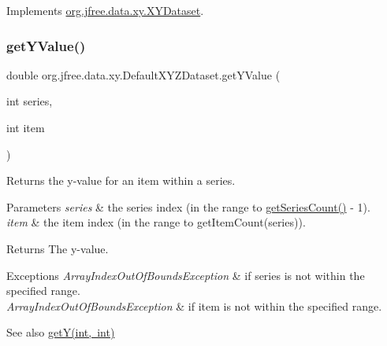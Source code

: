 Implements \mbox{\hyperlink{interfaceorg_1_1jfree_1_1data_1_1xy_1_1_x_y_dataset_aa915867221e0f94021bad3140db5254e}{org.\+jfree.\+data.\+xy.\+X\+Y\+Dataset}}.

\mbox{\label{classorg_1_1jfree_1_1data_1_1xy_1_1_default_x_y_z_dataset_a1d085e3b2a18c6af96b15fd78d4ae9e8}} 
\subsubsection{\texorpdfstring{get\+Y\+Value()}{getYValue()}}
{\footnotesize\ttfamily double org.\+jfree.\+data.\+xy.\+Default\+X\+Y\+Z\+Dataset.\+get\+Y\+Value (\begin{DoxyParamCaption}\item[{int}]{series,  }\item[{int}]{item }\end{DoxyParamCaption})}

Returns the y-\/value for an item within a series.


\begin{DoxyParams}{Parameters}
{\em series} & the series index (in the range {} to {\ttfamily \mbox{\hyperlink{classorg_1_1jfree_1_1data_1_1xy_1_1_default_x_y_z_dataset_a115138a06afdc19d3526ef73fabf578e}{get\+Series\+Count()}} -\/ 1}). \\
\hline
{\em item} & the item index (in the range {} to {\ttfamily get\+Item\+Count(series)}).\\
\hline
\end{DoxyParams}
\begin{DoxyReturn}{Returns}
The y-\/value.
\end{DoxyReturn}

\begin{DoxyExceptions}{Exceptions}
{\em Array\+Index\+Out\+Of\+Bounds\+Exception} & if {\ttfamily series} is not within the specified range. \\
\hline
{\em Array\+Index\+Out\+Of\+Bounds\+Exception} & if {\ttfamily item} is not within the specified range.\\
\hline
\end{DoxyExceptions}
\begin{DoxySeeAlso}{See also}
\mbox{\hyperlink{classorg_1_1jfree_1_1data_1_1xy_1_1_default_x_y_z_dataset_adcfdc1d2da9d58dae9cd6d2a006be1af}{get\+Y(int, int)}} 
\end{DoxySeeAlso}


